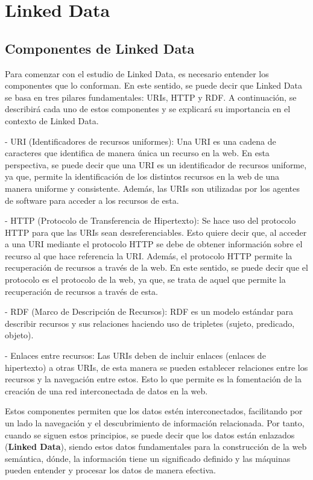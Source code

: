 \documentclass[11pt]{report}
\begin{document}
\chapter{Linked Data}

\section{Componentes de Linked Data}

Para comenzar con el estudio de Linked Data, es necesario entender los componentes que lo conforman. En este sentido, se puede decir que Linked Data se basa en tres pilares fundamentales: URIs, HTTP y RDF. A continuación, se describirá cada uno de estos componentes y se explicará su importancia en el contexto de Linked Data.

- URI (Identificadores de recursos uniformes): Una URI es una cadena de caracteres que identifica de manera única un recurso en la web. En esta perspectiva, se puede decir que una URI es un identificador de recursos uniforme, ya que, permite la identificación de los distintos recursos en la web de una manera uniforme y consistente. Además, las URIs son utilizadas por los agentes de software para acceder a los recursos de esta. 

- HTTP (Protocolo de Transferencia de Hipertexto): Se hace uso del protocolo HTTP para que las URIs sean desreferenciables. Esto quiere decir que, al acceder a una URI mediante el protocolo HTTP se debe de obtener información sobre el recurso al que hace referencia la URI. Además, el protocolo HTTP permite la recuperación de recursos a través de la web. En este sentido, se puede decir que el protocolo es el protocolo de la web, ya que, se trata de aquel que permite la recuperación de recursos a través de esta. 

- RDF (Marco de Descripción de Recursos): RDF es un modelo estándar para describir recursos y sus relaciones haciendo uso de tripletes (sujeto, predicado, objeto). 

- Enlaces entre recursos: Las URIs deben de incluir enlaces (enlaces de hipertexto) a otras URIs, de esta manera se pueden establecer relaciones entre los recursos y la navegación entre estos. Esto lo que permite es la fomentación de la creación de una red interconectada de datos en la web.

Estos componentes permiten que los datos estén interconectados, facilitando por un lado la navegación y el descubrimiento de información relacionada. Por tanto, cuando se siguen estos principios, se puede decir que los datos están enlazados (\textbf{Linked Data}), siendo estos datos fundamentales para la construcción de la web semántica, dónde, la información tiene un significado definido y las máquinas pueden entender y procesar los datos de manera efectiva.
\end{document}
